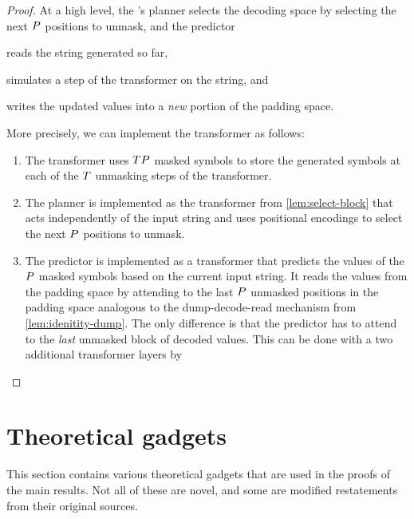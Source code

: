 \begin{proof}
   At a high level, the \sMDMAcr's planner selects the decoding space by selecting the next ${P}$ positions to unmask, and the predictor
   \begin{enumerate*}[label=\textit{(\arabic*)}]
      \item reads the string generated so far,
      \item simulates a step of the \eMDMAcr transformer on the string, and
      \item writes the updated values into a \emph{new} portion of the padding space.
   \end{enumerate*}
   
   More precisely, we can implement the \sMDMAcr transformer as follows:
   \begin{enumerate}[label=(\arabic*)]
      \item The \sMDMAcr transformer uses ${T} {P}$ masked symbols to store the generated symbols at each of the ${T}$ unmasking steps of the \eMDMAcr transformer.
      \item The planner is implemented as the transformer from \cref{lem:select-block} that acts independently of the input string and uses positional encodings to select the next ${P}$ positions to unmask.
      \item The predictor is implemented as a transformer that predicts the values of the ${P}$ masked symbols based on the current input string.
      It reads the values from the padding space by attending to the last ${P}$ unmasked positions in the padding space analogous to the dump-decode-read mechanism from \cref{lem:idenitity-dump}.
      The only difference is that the predictor has to attend to the \emph{last} unmasked block of decoded values.
      This can be done with a two additional transformer layers by 
   \end{enumerate}   
\end{proof}


\section{Theoretical gadgets} \label{app:theoretical-gadgets} 
This section contains various theoretical gadgets that are used in the proofs of the main results.
Not all of these are novel, and some are modified restatements from their original sources.

